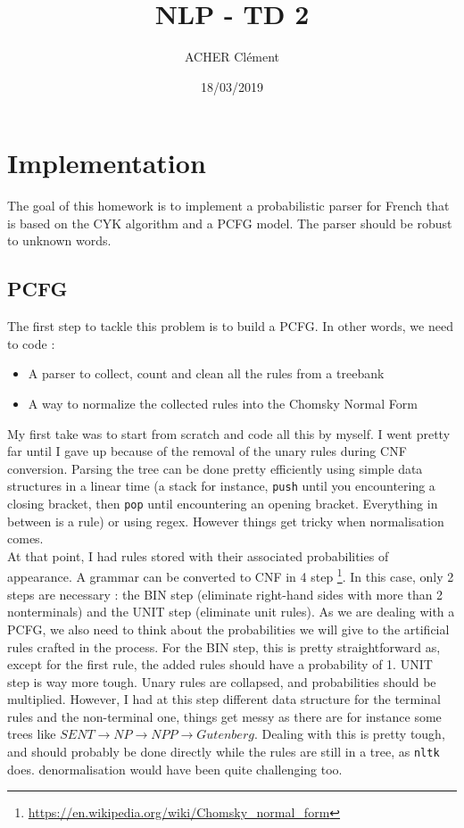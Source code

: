 \documentclass{article}
\title{NLP - TD 2}
\date{18/03/2019}
\author{ACHER Clément}
\begin{document}
\maketitle

\section{Implementation}

The goal of this homework is to implement a probabilistic parser for French that
is based on the CYK algorithm and a PCFG model. The parser should be robust to
unknown words.

\subsection{PCFG}

The first step to tackle this problem is to build a PCFG. In other words, we
need to code :

\begin{itemize}
\item A parser to collect, count and clean all the rules from a treebank
\item A way to normalize the collected rules into the Chomsky Normal Form\\
\end{itemize}

My first take was to start from scratch and code all this by myself. I went
pretty far until I gave up because of the removal of the unary rules during CNF
conversion. Parsing the tree can be done pretty efficiently using simple data
structures in a linear time (a stack for instance, \texttt{push} until you
encountering a closing bracket, then \texttt{pop} until encountering an opening
bracket. Everything in between is a rule) or using regex. However things get
tricky when normalisation comes.\\

At that point, I had rules stored with their associated probabilities of
appearance. A grammar can be converted to CNF in 4 step
\footnote{\url{https://en.wikipedia.org/wiki/Chomsky_normal_form}}.
In this case, only 2 steps are necessary : the BIN step (eliminate right-hand
sides with more than 2 nonterminals) and the UNIT step (eliminate unit rules).
As we are dealing with a PCFG, we also need to think about the probabilities we
will give to the artificial rules crafted in the process. For the BIN step, this
is pretty straightforward as, except for the first rule, the added rules should
have a probability of 1. UNIT step is way more tough. Unary rules are collapsed,
and probabilities should be multiplied. However, I had at this step different
data structure for the terminal rules and the non-terminal one, things get messy
as there are for instance some trees like $SENT \rightarrow NP \rightarrow NPP
\rightarrow Gutenberg$. Dealing with this is pretty tough, and should probably
be done directly while the rules are still in a tree, as \texttt{nltk} does.
denormalisation would have been quite challenging too.\\
\end{document}

